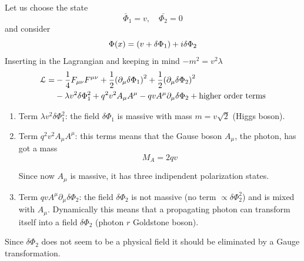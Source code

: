 \documentclass[../main/main.tex]{subfiles}
\begin{document}
Let us choose the state
\begin{equation}
  \bar{\Phi }_1 = v , \quad \bar{\Phi _2} = 0
\end{equation}
and consider
\begin{equation}
  \Phi (x) = \qty(v + \delta \Phi _1) + i \delta \Phi _2
\end{equation}
Inserting in the Lagrangian and keeping in mind \( - m^2 = v^2 \lambda  \)
\begin{equation}
\begin{split}
  \mathcal{L} = & - \frac{1}{4} F_ {\mu \nu }F ^{\mu \nu } + \frac{1}{2} \qty(\partial_ \mu \delta \Phi _1 )^2 + \frac{1}{2} \qty(\partial _ \mu \delta \Phi _2 )^2    \\
  & - \lambda v^2 \delta \Phi _1 ^2 + q^2 v^2 A_{\mu } A ^{\mu } - q v A ^{\mu } \partial_ \mu \delta \Phi _2 + \text{higher order terms}
\end{split}
\end{equation}
\begin{enumerate}
\item Term \( \lambda v^2 \delta \Phi _1^2 \): the field \( \delta \Phi _1 \) is massive with mass \( m= v \sqrt{2 \label{} }  \)  (Higgs boson).
\item Term \( q^2 v^2 A_ \mu A ^\mu  \): this terms means that the Gause boson \( A _ \mu  \), the photon, has got a mass
\begin{equation}
  M_A = 2 q v
\end{equation}
\begin{remark}
Since now \( A _ \mu  \) is massive, it has three indipendent polarization states.
\end{remark}

\item Term \( q v A ^ \mu  \partial _ \mu  \delta \Phi _2  \): the field \( \delta \Phi _2 \) is not massive (no term \( \propto \delta \Phi _2^2 \)) and is mixed with \( A_ \mu  \). Dynamically this means that a propagating photon can transform itself into a field \( \delta \Phi _2 \) (photon \( r \) Goldstone boson).
\end{enumerate}
Since \( \delta \Phi _2 \) does not seem to be a physical field it should be eliminated by a Gauge transformation.
\end{document}
